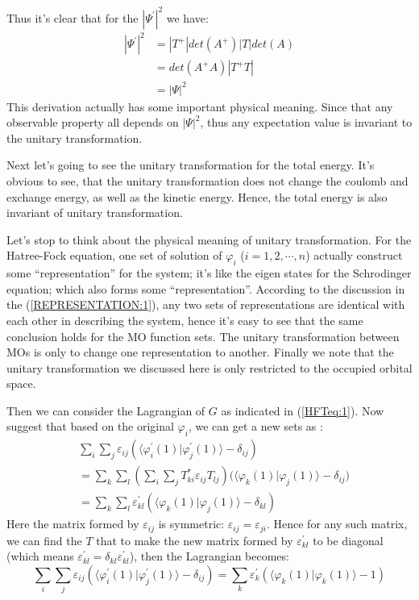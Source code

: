 Thus it's clear that for the $|\Psi^{'}|^{2}$ we have:
\begin{align}\label{}
|\Psi^{'}|^{2} &= |T^{+}|det(A^{+})|T|det(A) \nonumber \\
&=det(A^{+}A)|T^{+}T|\nonumber \\
&=|\Psi|^{2}
\end{align}
This derivation actually has some important physical meaning. Since
that any observable property all depends on $|\Psi|^{2}$, thus any
expectation value is invariant to the unitary transformation.

Next let's going to see the unitary transformation for the total energy. It's
obvious to see, that the unitary transformation does not change the coulomb and
exchange energy, as well as the kinetic energy. Hence, the total energy is also
invariant of unitary transformation.

Let's stop to think about the physical meaning of unitary transformation. For
the Hatree-Fock equation, one set of solution of $\varphi_{i}$ ($i=1,2,\cdots,
n$) actually construct some ``representation'' for the system; it's like the
eigen states for the Schrodinger equation; which also forms some
``representation''. According to the discussion in the
(\ref{REPRESENTATION:1}), any two sets of representations are identical with
each other in describing the system, hence it's easy to see that the same
conclusion holds for the MO function sets. The unitary transformation between
MOs is only to change one representation to another. Finally we note that the
unitary transformation we discussed here is only restricted to the occupied
orbital space.

Then we can consider the Lagrangian of $G$ as indicated in (\ref{HFTeq:1}).
Now suggest that based on the original $\varphi_{i}$, we can get a new sets
as :
\begin{align}
&\sum_{i}\sum_{j}\varepsilon_{ij}(\langle\varphi_{i}^{'}(1)|\varphi_{j}^{
'}(1)\rangle
-\delta_{ij}) \nonumber \\
&=\sum_{k}\sum_{l}(\sum_{i}\sum_{j}T^{*}_{ki}\varepsilon_{ij}T_{lj}
)\Big(\langle \varphi_{k} (1)|\varphi_ { j } (1)\rangle
-\delta_{ij}\Big) \nonumber \\
&=\sum_{k}\sum_{l}\varepsilon^{'}_{kl}(\langle
\varphi_{k} (1)|\varphi_ { j } (1)\rangle
-\delta_{kl})
\end{align}
 Here the matrix formed by $\varepsilon_{ij}$ is symmetric: $\varepsilon_{ij} =
\varepsilon_{ji}$. Hence for any such matrix, we can find the $T$ that to make
the new matrix formed by $\varepsilon_{kl}^{'}$ to be diagonal (which means
$\varepsilon_{kl}^{'} = \delta_{kl}\varepsilon_{kl}^{'}$), then the Lagrangian
becomes:
\begin{equation}
\sum_{i}\sum_{j}\varepsilon_{ij}(\langle\varphi_{i}^{'}(1)|\varphi_{j}^{
'}(1)\rangle
-\delta_{ij}) =\sum_{k}\varepsilon^{'}_{k}(\langle
\varphi_{k} (1)|\varphi_ { k} (1)\rangle
- 1)
\end{equation}

